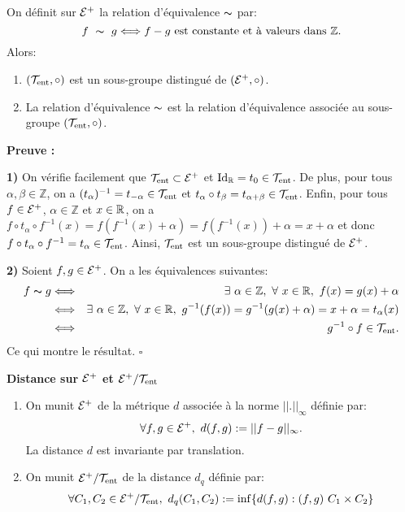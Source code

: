 \begin{proposition}
	On définit sur ${\mathcal{E}}^+$ la relation d'équivalence $\thicksim$ par:
	$$f\ \thicksim\ g \Longleftrightarrow f-g \text{ est constante et à valeurs dans\ } \mathbb{Z}.$$
	Alors:
	\begin{enumerate}
		\item $(\mathcal{T}_{\mathrm{ent}}, \circ)$ est un sous-groupe distingué de $({\mathcal{E}}^+,\circ)$.
		\item La relation d'équivalence $\thicksim$ est la relation d'équivalence associée au sous-groupe $(\mathcal{T}_{\mathrm{ent}},\circ)$.
	\end{enumerate}
\end{proposition}
\textbf{Preuve :}
\par \textbf{1) } On vérifie facilement que $\mathcal{T}_{\mathrm{ent}} \subset {\mathcal{E}}^+$ et
$\mathrm{Id}_{\mathbb{R}}=t_0 \in \mathcal{T}_{\mathrm{ent}}$. De plus, pour tous $\alpha, \beta \in \mathbb{Z}$, on
a $(t_\alpha)^{-1}=t_{-\alpha} \in \mathcal{T}_{\mathrm{ent}}$ et $t_\alpha\circ t_\beta=t_{\alpha +
\beta} \in \mathcal{T}_{\mathrm{ent}}$. Enfin, pour tous $f \in {\mathcal{E}}^+$, $\alpha \in \mathbb{Z}$ et $x
\in {\mathbb{R}}$, on a $f\circ t_\alpha \circ
f^{-1}(x)=f(f^{-1}(x)+\alpha)=f(f^{-1}(x))+\alpha=x+\alpha$ et donc $f\circ
t_\alpha \circ f^{-1}=t_\alpha \in \mathcal{T}_{\mathrm{ent}}$. Ainsi, $\mathcal{T}_{\mathrm{ent}}$ est un sous-groupe
distingué de ${\mathcal{E}}^+$.\\

\par \textbf{2) }Soient $f,g \in {\mathcal{E}}^+$. On a les équivalences suivantes:
\begin{eqnarray*}
	f \thicksim g &\Longleftrightarrow& \exists\ \alpha \in \mathbb{Z},\ \forall\ x \in \Rbb,\ f(x)=g(x)+\alpha \\
	&\Longleftrightarrow& \exists\ \alpha \in \mathbb{Z},\ \forall\ x \in \Rbb,\ g^{-1}(f(x))=g^{-1}(g(x)+\alpha)=x + \alpha =t_\alpha(x) \\
	&\Longleftrightarrow&g^{-1}\circ f \in \Tent.
\end{eqnarray*}
Ce qui montre le résultat. \hfill $\square$\\











\begin{defippt} \textbf{Distance sur ${\mathcal{E}}^+$ et $\mathcal{E}^+/\mathcal{T}_{\mathrm{ent}}$}\\
	\begin{enumerate}
		\item On munit ${\mathcal{E}}^+$ de la métrique $d$ associée à la norme $||.||_{\infty}$ définie par:
		$$\forall f,g \in \Ec^+,\ d(f,g):=||f-g||_{\infty}.$$
		La distance $d$ est invariante par translation.
		\item On munit $\mathcal{E}^+/\mathcal{T}_{\mathrm{ent}}$ de la distance $d_q$ définie par:
			$$\forall C_1, C_2 \in \mathcal{E}^+/\mathcal{T}_{\mathrm{ent}},\ d_q(C_1,C_2):=\inf\lbrace d(f,g): (f,g)\ C_1 \times C_2\rbrace$$
	\end{enumerate}
\end{defippt}



